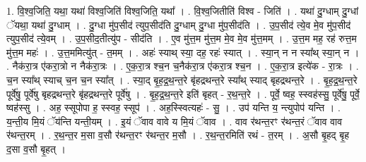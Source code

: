 \documentclass[17pt]{extarticle}
\begin{document}
1. वि॒श्व॒जिति॒ यथा॒ यथा॑ विश्व॒जिति॑ विश्व॒जिति॒ यथा᳚ । . वि॒श्व॒जितीति॑ विश्व - जिति॑ । . यथा॑ दु॒ग्धाम् दु॒ग्धां ॅयथा॒ यथा॑ दु॒ग्धाम् । . दु॒ग्धा मु॑प॒सीद॑ त्युप॒सीद॑ति दु॒ग्धाम् दु॒ग्धा मु॑प॒सीद॑ति । . उ॒प॒सीद॑ त्ये॒व मे॒व मु॑प॒सीद॑ त्युप॒सीद॑ त्ये॒वम् । . उ॒प॒सीद॒तीत्यु॑प - सीद॑ति । . ए॒व मु॑त्त॒म मु॑त्त॒म मे॒व मे॒व मु॑त्त॒मम् । . उ॒त्त॒म मह॒ रह॑ रुत्त॒म मु॑त्त॒म महः॑ । . उ॒त्त॒ममित्यु॑त् - त॒मम् । . अहः॑ स्याथ् स्या॒ दह॒ रहः॑ स्यात् । . स्या॒न् न न स्या᳚थ् स्या॒न् न । . नैक॑रा॒त्र ए॑करा॒त्रो न नैक॑रा॒त्रः । . ए॒क॒रा॒त्र श्च॒न च॒नैक॑रा॒त्र ए॑करा॒त्र श्च॒न । . ए॒क॒रा॒त्र इत्ये॑क - रा॒त्रः । . च॒न स्या᳚थ् स्याच् च॒न च॒न स्या᳚त् । . स्या॒द् बृ॒ह॒द्र॒थ॒न्त॒रे बृ॑हद्रथन्त॒रे स्या᳚थ् स्याद् बृहद्रथन्त॒रे । . बृ॒ह॒द्र॒थ॒न्त॒रे पूर्वे॑षु॒ पूर्वे॑षु बृहद्रथन्त॒रे बृ॑हद्रथन्त॒रे पूर्वे॑षु । . बृ॒ह॒द्र॒थ॒न्त॒रे इति॑ बृहत् - र॒थ॒न्त॒रे । . पूर्वे॒ ष्वह॒ स्स्वह॑स्सु॒ पूर्वे॑षु॒ पूर्वे॒ ष्वह॑स्सु । . अह॒ स्सूपोपा ह॒ स्स्वह॒ स्सूप॑ । . अह॒स्स्वित्यहः॑ - सु॒ । . उप॑ यन्ति य॒ न्त्युपोप॑ यन्ति । . य॒न्ती॒य मि॒यं ॅय॑न्ति यन्ती॒यम् । . इ॒यं ॅवाव वावे य मि॒यं ॅवाव । . वाव र॑थन्त॒रꣳ र॑थन्त॒रं ॅवाव वाव र॑थन्त॒रम् । . र॒थ॒न्त॒र म॒सा व॒सौ र॑थन्त॒रꣳ र॑थन्त॒र म॒सौ । . र॒थ॒न्त॒रमिति॑ रथं - त॒रम् । . अ॒सौ बृ॒हद् बृ॒ह द॒सा व॒सौ बृ॒हत् । \newline
\end{document}
